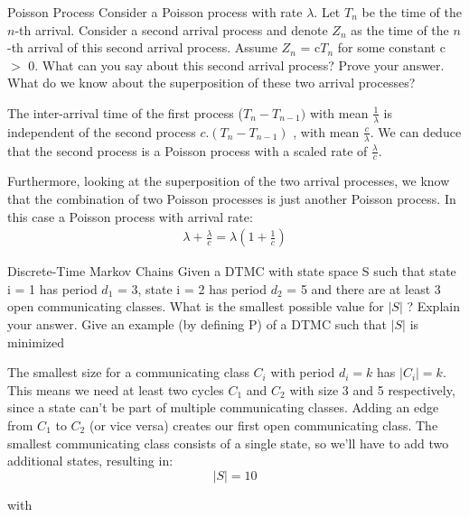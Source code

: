 \begin{problem}{Poisson Process}
Consider a Poisson process with rate $\lambda$. Let $T_n$ be the time of the $n$-th arrival. Consider a second arrival process and denote $Z_n$ as the time of the $n$-th arrival of this second arrival process. Assume $Z_n$ = c$T_n$ for some constant c $>$ 0. What can you say about this second arrival process? Prove your answer. What do we know about the superposition of these two arrival processes?
\end{problem}

\begin{solution} 
The inter-arrival time of the first process ($T_n - T_{n-1})$ with mean $\frac{1}{\lambda}$ is independent of the second process $ c.(T_n - T_{n-1})$ , with mean $\frac{c}{\lambda}$. We can deduce that the second process is a Poisson process with a scaled rate of $\frac{\lambda}{c}$. 

Furthermore, looking at the superposition of the two arrival processes, we know that the combination of two Poisson processes is just another Poisson process. In this case a Poisson process with arrival rate:
\begin{align*}
    \lambda +\frac{\lambda}{c}= \lambda\left (1+\frac{1}{c}  \right )
\end{align*}
\end{solution}

\begin{problem}{Discrete-Time Markov Chains}
Given a DTMC with state space S such that state i = 1 has period $d_1$ = 3, state i = 2 has period $d_2$ = 5 and there are at least 3 open communicating classes. What is the smallest possible value for $| S |$  ? Explain your answer. Give an example (by defining P) of a DTMC such that $| S |$ is minimized
\end{problem}

\begin{solution}
  The smallest size for a communicating class $C_i$ with period $d_i=k$ has $|C_i|=k$. This means we need at least two cycles $C_1$ and $C_2$ with size 3 and 5 respectively, since a state can't be part of multiple communicating classes. Adding an edge from $C_1$ to $C_2$ (or vice versa) creates our first open communicating class. The smallest communicating class consists of a single state, so we'll have to add two additional states, resulting in:
  \[
  \boxed{| S | = 10}
  \]
\end{solution}

with 

